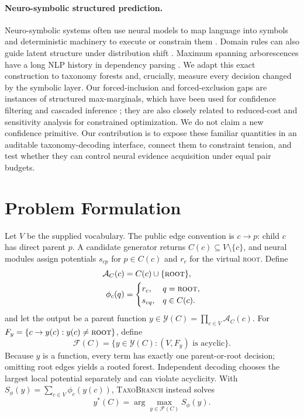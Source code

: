 \documentclass[11pt]{article}
\newcommand{\rootnode}{\textsc{root}}
\newcommand{\method}{\textsc{TaxoBranch}}
\begin{document}
\paragraph{Neuro-symbolic structured prediction.}
Neuro-symbolic systems often use neural models to map language into symbols
and deterministic machinery to execute or constrain them
\citep{liang-etal-2017-neural}.  Domain rules can also guide latent structure
under distribution shift \citep{pryor-etal-2023-using}.  Maximum spanning
arborescences have a long NLP history in dependency parsing
\citep{mcdonald-etal-2005-non}.  We adapt this exact construction to taxonomy
forests and, crucially, measure every decision changed by the symbolic layer.
Our forced-inclusion and forced-exclusion gaps are instances of structured
max-marginals, which have been used for confidence filtering and cascaded
inference \citep{weiss-taskar-2010-structured}; they are also closely related to
reduced-cost and sensitivity analysis for constrained optimization. We do not
claim a new confidence primitive. Our contribution is to expose these familiar
quantities in an auditable taxonomy-decoding interface, connect them to
constraint tension, and test whether they can control neural evidence acquisition
under equal pair budgets.

\section{Problem Formulation}

Let $V$ be the supplied vocabulary. The public edge convention is
$c\!\rightarrow\!p$: child $c$ has direct parent $p$. A candidate generator
returns $C(c)\subseteq V\setminus\{c\}$, and neural modules assign potentials
$s_{cp}$ for $p\in C(c)$ and $r_c$ for the virtual \rootnode. Define
\begin{align}
 \mathcal A_C(c)&=C(c)\cup\{\rootnode\},\\
 \phi_c(q)&=\begin{cases}r_c,&q=\rootnode,\\s_{cq},&q\in C(c).\end{cases}
\end{align}
and let the output be a parent function
$y\in\mathcal Y(C)=\prod_{c\in V}\mathcal A_C(c)$.
For $F_y=\{c\rightarrow y(c):y(c)\neq\rootnode\}$, define
\begin{equation}
 \mathcal F(C)=\{y\in\mathcal Y(C):(V,F_y)\text{ is acyclic}\}.
\end{equation}
Because $y$ is a function, every term has exactly one parent-or-root decision;
omitting root edges yields a rooted forest. Independent decoding chooses the
largest local potential separately and can violate acyclicity. With
$S_\phi(y)=\sum_{c\in V}\phi_c(y(c))$, \method{} instead solves
\begin{equation}
 y^*(C)=\arg\max_{y\in\mathcal F(C)}S_\phi(y).
 \label{eq:objective}
\end{equation}
\end{document}
